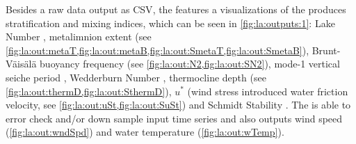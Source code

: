 Besides a raw data output as \ac{CSV}, the \la features a visualizations of the produces stratification and mixing indices, which can be seen in \cref{fig:la:outputs:1}: Lake Number \citep[see \cref{fig:la:out:Ln,fig:la:out:SLn},][]{imberger1990}, metalimnion extent (see \cref{fig:la:out:metaT,fig:la:out:metaB,fig:la:out:SmetaT,fig:la:out:SmetaB}), Brunt-Väisälä buoyancy frequency (see \cref{fig:la:out:N2,fig:la:out:SN2}), mode-1 vertical seiche period \citep[see \cref{fig:la:out:T1,fig:la:out:ST1},][]{monismith1986}, Wedderburn Number \citep[see \cref{fig:la:out:W,fig:la:out:SW},][]{thompson1980}, thermocline depth (see \cref{fig:la:out:thermD,fig:la:out:SthermD}), $u^{*}$ (wind stress introduced water friction velocity, see \cref{fig:la:out:uSt,fig:la:out:SuSt}) and Schmidt Stability \citep[see \cref{fig:la:out:St},][]{schmidt1928,hutchinson1957,idso1973}. The \la is able to error check and/or down sample input time series and also outputs wind speed (\cref{fig:la:out:wndSpd}) and water temperature (\cref{fig:la:out:wTemp}).

